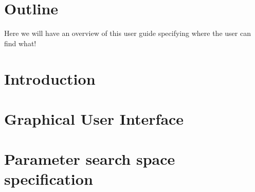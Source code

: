 \documentclass[twoside,a4paper]{refart}
\theoremstyle{dotless}
\newcounter{ex}
\begin{document}

	

\section{Outline}
\label{outline}
Here we will have an overview of this user guide specifying where the user can find what!

\section{Introduction}


\section{Graphical User Interface}






\newpage

\section{Parameter search space specification}
\label{parameter_spec}

\clearpage
\end{document}
